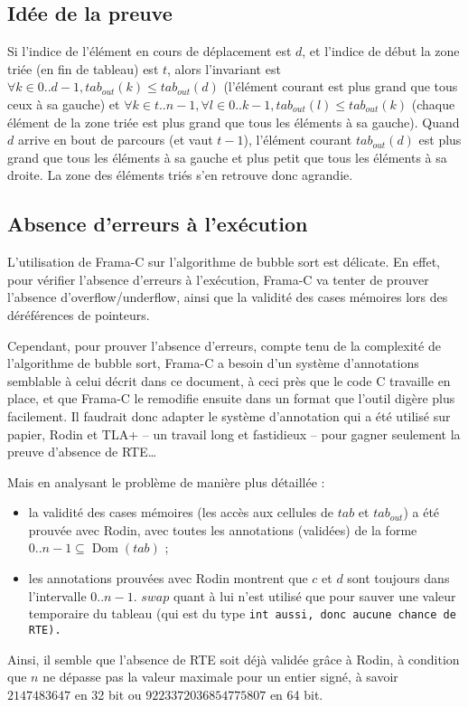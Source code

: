 \documentclass[a4paper, 11pt]{article}
\DeclareMathOperator{\ddom}{Dom}
\newcommand{\dom}[1]{\ddom\left(#1\right)}
\theoremstyle{mystyle}
\begin{document}
\clearpage\subsection{Idée de la preuve}

Si l'indice de l'élément en cours de déplacement est $d$, et l'indice de début la zone triée (en fin de tableau) est $t$, alors l'invariant est $\forall k \in 0..d - 1, tab_{out}(k) \leq tab_{out}(d)$ (\og{}l'élément courant est plus grand que tous ceux à sa gauche\fg{}) et $\forall k \in t..n - 1, \forall l \in 0..k - 1, tab_{out}(l) \leq tab_{out}(k)$ (\og{}chaque élément de la zone triée est plus grand que tous les éléments à sa gauche\fg{}). Quand $d$ arrive en bout de parcours (et vaut $t - 1$), l'élément courant $tab_{out}(d)$ est plus grand que tous les éléments à sa gauche et plus petit que tous les éléments à sa droite. La zone des éléments triés s'en retrouve donc agrandie.

\subsection{Absence d'erreurs à l'exécution}

L'utilisation de Frama-C sur l'algorithme de bubble sort est délicate. En effet, pour vérifier l'absence d'erreurs à l'exécution, Frama-C va tenter de prouver l'absence d'overflow/underflow, ainsi que la validité des cases mémoires lors des déréférences de pointeurs.

Cependant, pour prouver l'absence d'erreurs, compte tenu de la complexité de l'algorithme de bubble sort, Frama-C a besoin d'un système d'annotations semblable à celui décrit dans ce document, à ceci près que le code C travaille en place, et que Frama-C le remodifie ensuite dans un format que l'outil digère plus facilement. Il faudrait donc adapter le système d'annotation qui a été utilisé sur papier, Rodin et TLA+ -- un travail long et fastidieux -- pour gagner seulement la preuve d'absence de RTE\ldots{}

Mais en analysant le problème de manière plus détaillée :
\begin{itemize}
    \item la validité des cases mémoires (les accès aux cellules de $tab$ et $tab_{out}$) a été prouvée avec Rodin, avec toutes les annotations (validées) de la forme $0..n - 1 \subseteq \dom{tab}$ ;
    \item les annotations prouvées avec Rodin montrent que $c$ et $d$ sont toujours dans l'intervalle $0..n - 1$. $swap$ quant à lui n'est utilisé que pour sauver une valeur temporaire du tableau (qui est du type \tt{int} aussi, donc aucune chance de RTE).
\end{itemize}
Ainsi, il semble que l'absence de RTE soit déjà validée grâce à Rodin, à condition que $n$ ne dépasse pas la valeur maximale pour un entier signé, à savoir $2147483647$ en 32 bit ou $9223372036854775807$ en 64 bit.
\end{document}
